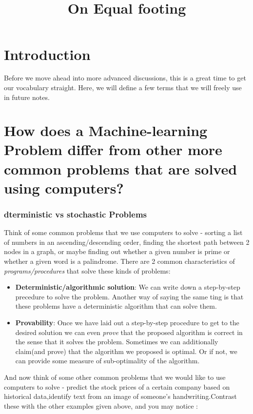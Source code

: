 \documentclass[]{article}
\title{On Equal footing}
\author{}
\begin{document}
	
	\maketitle
	\section{Introduction}
	Before we move ahead into more advanced discussions, this is a great time to get our vocabulary straight. Here, we will define a few terms that we will freely use in future notes.
	\section{How does a Machine-learning Problem differ from other more common problems that are solved using computers?}
	\subsubsection{dterministic vs stochastic Problems}
	Think of some common problems that we use computers to solve - sorting a list of numbers in an ascending/descending order, finding the shortest path between 2 nodes in a graph, or maybe finding out whether a given number is prime or whether a given word is a palindrome. There are 2 common characteristics of \textit{programs/procedures} that solve these kinds of problems:
	\begin{itemize}
		\item \textbf{Deterministic/algorithmic solution}: We can write down a step-by-step precedure to solve the problem. Another way of saying the same ting is that these problems have a deterministic algorithm that can solve them.
		\item \textbf{Provability}: Once we have laid out a step-by-step procedure to get to the desired solution we can even \textit{prove} that the proposed algorithm is correct in the sense that it solves the problem. 
		Sometimes we can additionally claim(and prove) that the algorithm we proposed is optimal. Or if not, we can provide some measure of sub-optimality of the algorithm.
	\end{itemize}
	And now think of some other common problems that we would like to use computers to solve - predict the stock prices of a certain company based on historical data,identify text from an image of someone's handwriting.Contrast these with the other examples given above, and you may notice :
\end{document}
